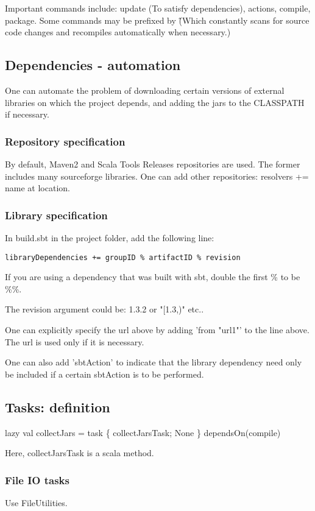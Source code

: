 \documentclass[oneside, article]{memoir}
\begin{document}
Important commands include: update (To satisfy dependencies), actions, compile, package. Some commands may be prefixed by \~ (Which constantly scans for source code changes and recompiles automatically when necessary.)

\subsection{Dependencies - automation}
One can automate the problem of downloading certain versions of external libraries on which the project depends, and adding the jars to the CLASSPATH if necessary.

\subsubsection{Repository specification}
By default, Maven2 and Scala Tools Releases repositories are used. The former includes many sourceforge libraries. One can add other repositories: resolvers += name at location.

\subsubsection{Library specification}
In build.sbt in the project folder, add the following line:
\begin{verbatim}
libraryDependencies += groupID % artifactID % revision
\end{verbatim}
If you are using a dependency that was built with sbt, double the first \% to be \%\%.

The revision argument could be: 1.3.2 or "[1.3,)" etc..

One can explicitly specify the url above by adding 'from "url1"' to the line above. The url is used only if it is necessary.

One can also add 'sbtAction' to indicate that the library dependency need only be included if a certain sbtAction is to be performed. \chk

\subsection{Tasks: definition}
lazy val collectJars = task \{ collectJarsTask; None \} dependsOn(compile)

Here, collectJarsTask is a scala method.

\subsubsection{File IO tasks}
Use FileUtilities.
\end{document}
